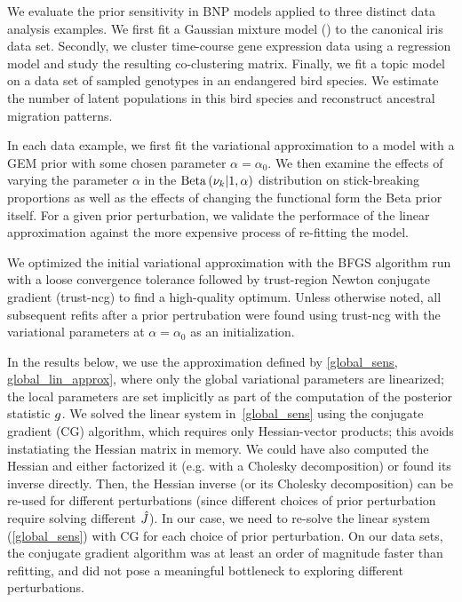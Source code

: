 We evaluate the prior sensitivity in BNP models applied to three distinct data analysis examples.
We first fit a Gaussian mixture model () to the canonical iris data set.
Secondly, we cluster time-course gene expression data using a regression model
and study the resulting co-clustering matrix.
Finally, we fit a topic model
on a data set of sampled genotypes in an endangered bird species.
We estimate the number of latent populations in this
bird species and reconstruct ancestral migration patterns.

In each data example, we first fit the variational approximation to a model
with a GEM prior with some chosen parameter $\alpha = \alpha_0$.
We then examine the effects of varying the parameter $\alpha$
in the $\mathrm{Beta}\left(\nu_{k} \vert 1, \alpha\right)$ distribution on stick-breaking proportions
as well as
the effects of changing the functional form the Beta prior itself.
For a given prior perturbation,
we validate the performace of the linear approximation against
the more expensive process of re-fitting the model.

We optimized the initial variational approximation with
the BFGS algorithm run with a loose convergence tolerance
followed by trust-region Newton conjugate gradient (trust-ncg) to find a high-quality optimum.
Unless otherwise noted, all subsequent refits after a prior pertrubation were found
using trust-ncg with the variational parameters at $\alpha = \alpha_0$ as an initialization.

In the results below, we use
the approximation defined by \eqref{global_sens, global_lin_approx},
where only the global variational parameters are linearized;
the local parameters are set implicitly as part of the
computation of the posterior statistic $g$.
We solved the linear system in~\eqref{global_sens} using
the conjugate gradient (CG) algorithm, which requires only Hessian-vector products;
this avoids instatiating the Hessian matrix in memory.
We could have also computed the Hessian and
either factorized it (e.g. with a Cholesky decomposition) or found its inverse directly.
Then, the Hessian inverse (or its Cholesky decomposition) can
be re-used for different perturbations
(since different choices of prior perturbation
require solving different $\hat J$).
In our case, we need to re-solve the linear system (\eqref{global_sens}) with
CG for each choice of prior perturbation.
On our data sets, the conjugate gradient algorithm was at least
an order of magnitude faster than refitting, and did not pose a meaningful bottleneck
to exploring different perturbations.

